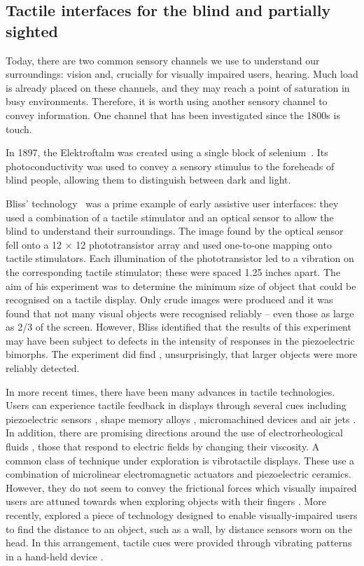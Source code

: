 \subsection{Tactile interfaces for the blind and partially sighted}

Today, there are two common sensory channels we use to understand our surroundings: vision and, crucially for visually impaired users, hearing. Much load is already placed on these channels, and they may reach a point of saturation in busy environments. Therefore, it is worth using another sensory channel to convey information. One channel that has been investigated since the 1800s is touch. 

In 1897, the Elektroftalm was created using a single block of selenium~\citep{chekhchoukh2011vision}. Its photoconductivity was used to convey a sensory stimulus to the foreheads of blind people, allowing them to distinguish between dark and light. 

Bliss' technology~\citep{bliss1970optical} was a prime example of early assistive user interfaces: they used a combination of a tactile stimulator and an optical sensor to allow the blind to understand their surroundings. The image found by the optical sensor fell onto a 12 $\times$ 12 phototransistor array and used one-to-one mapping onto tactile stimulators. Each illumination of the phototransistor led to a vibration on the corresponding tactile stimulator; these were spaced 1.25 inches apart. The aim of his experiment was to determine the minimum size of object that could be recognised on a tactile display.  Only crude images were produced and it was found that not many visual objects were recognised reliably -- even those as large as 2/3 of the screen.  However, Bliss identified that the results of this experiment may have been subject to defects in the intensity of responses in the piezoelectric bimorphs.  The experiment did find , unsurprisingly, that larger objects were more reliably detected.


In more recent times, there have been many advances in tactile technologies. Users can experience tactile feedback in displays through several cues including piezoelectric sensors \citep{pasquero2003stress}, shape memory alloys \citep{vidal2003thermopneumatic}, micromachined devices \cite{lee2005micromachined} and air jets \citep{asamura1998selectively}. In addition, there are promising directions around the use of electrorheological fluids \citep{pasquero2003stress}, those that respond to electric fields by changing their viscosity. A common class of technique under exploration is vibrotactile displays. These use a combination of microlinear electromagnetic actuators and piezoelectric ceramics. However, they do not seem to convey the frictional forces which visually impaired users are attuned towards when exploring objects with their fingers \citep{hafez2007tactile}.  More recently, \citet{hartcher2015perception} explored a piece of technology designed to enable visually-impaired users to find the distance to an object, such as a wall, by distance sensors worn on the head. In this arrangement, tactile cues were provided through vibrating patterns in a hand-held device \citep{hartcher2015perception}.  

